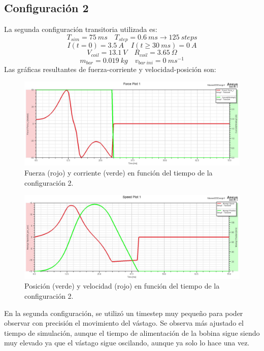 \subsection*{Configuración 2}
La segunda configuración transitoria utilizada es:
\[
T_{sim}=75~ms \quad T_{step}=0.6~ms \to 125~steps
\]
\[
I(t=0)=3.5~A \quad I(t\geq 30~ms)=0~A
\]
\[
V_{coil}=13.1~V \quad R_{coil}=3.65~\Omega
\]
\[
m_{bar}=0.019~kg \quad v_{bar~ini}=0~ms^{-1}
\]
Las gráficas resultantes de fuerza-corriente y velocidad-posición son:
\begin{figure}[H]
    \centering
    \includegraphics[width=13cm]{FigurasMemoria/S2ForceCurrent.jpg}
    \caption{Fuerza (rojo) y corriente (verde) en función del tiempo de la configuración 2.}
    \label{fig:S2ForceCurrent} %
\end{figure}
\begin{figure}[H]
    \centering
    \includegraphics[width=13cm]{FigurasMemoria/S2SpeedPosition.jpg}
    \caption{Posición (verde) y velocidad (rojo) en función del tiempo de la configuración 2.}
    \label{fig:S2SpeedPosition} %
\end{figure}
En la segunda configuración, se utilizó un timestep muy pequeño para poder observar con precisión el movimiento del vástago. Se observa más ajustado el tiempo de simulación, aunque el tiempo de alimentación de la bobina sigue siendo muy elevado ya que el vástago sigue oscilando, aunque ya solo lo hace una vez. 

